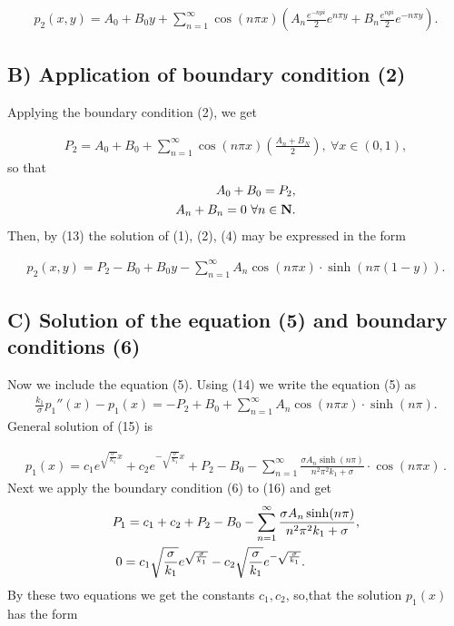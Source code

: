 \documentclass[times]{nlaauth}%
\begin{document}
\begin {gather}
p_2 (x,y) = A_0 + B_0 y + \sum ^{\infty}_{n=1} \cos (n\pi x) (A_n \frac {e^{-n pi}}{2}e^{n\pi y}
+B_n \frac {e^{n pi}}{2}e^{-n\pi y}).
\end {gather}

\subsection {B) Application of boundary condition (2)}

Applying the boundary condition (2), we get

\begin {gather}
P_2 = A_0 + B_0 + \sum ^{\infty}_{n=1} \cos (n\pi x) (\frac {A_n +B_N}{2}), \ \forall x \in (0,1), \nonumber
\end {gather}
so that 
\begin{eqnarray}
A_0 + B_0 = P_2 , \nonumber \\
A_n + B_n = 0 \ \forall n\in {\bf N}.\vspace {8 mm}\nonumber
\end{eqnarray}
Then, by (13) the solution of (1), (2), (4) may be expressed in the form

\begin {gather}
p_2(x,y) = P_2 - B_0 + B_0 y - \sum ^{\infty}_{n=1} A_n \cos (n\pi x) \cdot \sinh (n\pi (1-y)).
\end {gather}

\subsection {C) Solution of the equation (5) and boundary conditions (6)}

Now we include the equation (5). Using (14) we write the equation (5) as
\begin {gather}
\frac{k_1}{\sigma} p_1''(x) - p_1 (x) = -P_2 + B_0 + \sum ^{\infty}_{n=1} A_n \cos (n\pi x) \cdot \sinh (n\pi).
\end {gather}
General solution of (15) is

\begin {gather}
p_1(x) = c_1 e^{\sqrt{\frac{\sigma}{k_1}}x} + c_2 e^{-\sqrt{\frac{\sigma}{k_1}}x} + P_2 - B_0 
- \sum^{\infty}_{n=1} \frac{\sigma A_n \sinh(n\pi)}{n^2\pi^2 k_1 + \sigma} \cdot \cos (n\pi x) \, .
\end {gather}
Next we apply the boundary condition (6) to (16) and get
\begin{eqnarray}
P_1 = c_1 + c_2 + P_2 - B_0 - \sum^{\infty}_{n=1} \frac{\sigma A_n \sinh(n\pi)}{n^2\pi^2 k_1 + \sigma}  , \nonumber \\
0 = c_1 \sqrt{\frac{\sigma}{k_1}} e^{\sqrt{\frac{\sigma}{k_1}}}
-c_2 \sqrt{\frac{\sigma}{k_1}} e^{-\sqrt{\frac{\sigma}{k_1}}}
.\hspace {15 mm}\nonumber
\end{eqnarray}
By these two equations we get the constants $c_1, c_2$, so,that the solution $p_1(x)$ has the form
\end{document}
